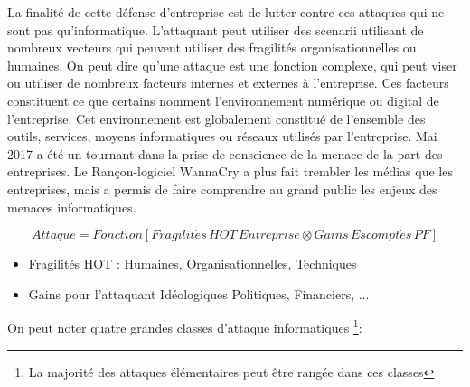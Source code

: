 La finalité de cette défense d’entreprise est de lutter contre ces attaques qui ne sont pas qu’informatique. L’attaquant peut utiliser des scenarii utilisant de nombreux vecteurs qui peuvent utiliser des fragilités organisationnelles ou humaines. On peut dire qu’une attaque est une fonction complexe, qui peut viser ou utiliser de nombreux facteurs internes et externes à l’entreprise. Ces facteurs constituent ce que certains nomment l’environnement numérique ou digital de l’entreprise. Cet environnement est globalement constitué de l’ensemble des outils, services, moyens informatiques ou réseaux utilisés par l’entreprise.
Mai 2017 a été un tournant dans la prise de conscience de la menace de la part des entreprises. Le Rançon-logiciel WannaCry a plus fait trembler les médias que les entreprises, mais a permis de faire comprendre au grand public les enjeux des menaces informatiques.


\begin{nota}
\begin{equation}
Attaque = Fonction \left[ Fragilit\acute{e}s\,HOT\, Entreprise\otimes Gains\,Escompt\acute{e}s\,PF \right]
\end{equation}
\end{nota}

\begin{itemize}
	\item Fragilités HOT : Humaines, Organisationnelles, Techniques 
	\item Gains pour l'attaquant Idéologiques Politiques, Financiers, ...
\end{itemize}

On peut noter quatre grandes classes d’attaque informatiques \footnote{La majorité des attaques élémentaires peut être rangée dans ces classes}:

